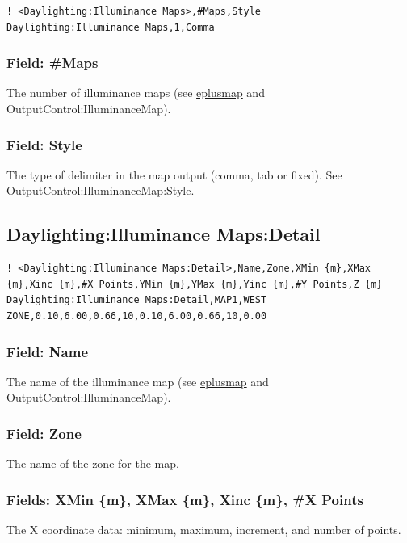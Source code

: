 \begin{lstlisting}
! <Daylighting:Illuminance Maps>,#Maps,Style
Daylighting:Illuminance Maps,1,Comma
\end{lstlisting}

\subsubsection{Field: \#Maps}\label{field-number-maps}
The number of illuminance maps (see \hyperref[eplusmap.ext]{eplusmap} and OutputControl:IlluminanceMap).

\subsubsection{Field: Style}\label{style-maps}
The type of delimiter in the map output (comma, tab or fixed). See OutputControl:IlluminanceMap:Style.

\subsection{Daylighting:Illuminance Maps:Detail}\label{daylighting-illuminace-maps-detail}

\begin{lstlisting}
! <Daylighting:Illuminance Maps:Detail>,Name,Zone,XMin {m},XMax {m},Xinc {m},#X Points,YMin {m},YMax {m},Yinc {m},#Y Points,Z {m}
Daylighting:Illuminance Maps:Detail,MAP1,WEST ZONE,0.10,6.00,0.66,10,0.10,6.00,0.66,10,0.00
\end{lstlisting}

\subsubsection{Field: Name}\label{field-maps-name}
The name of the illuminance map (see \hyperref[eplusmap.ext]{eplusmap} and OutputControl:IlluminanceMap).

\subsubsection{Field: Zone}\label{field-maps-zone}
The name of the zone for the map.

\subsubsection{Fields: XMin \{m\}, XMax \{m\}, Xinc \{m\}, #X Points}\label{field-maps-xcoords}
The X coordinate data: minimum, maximum, increment, and number of points.


